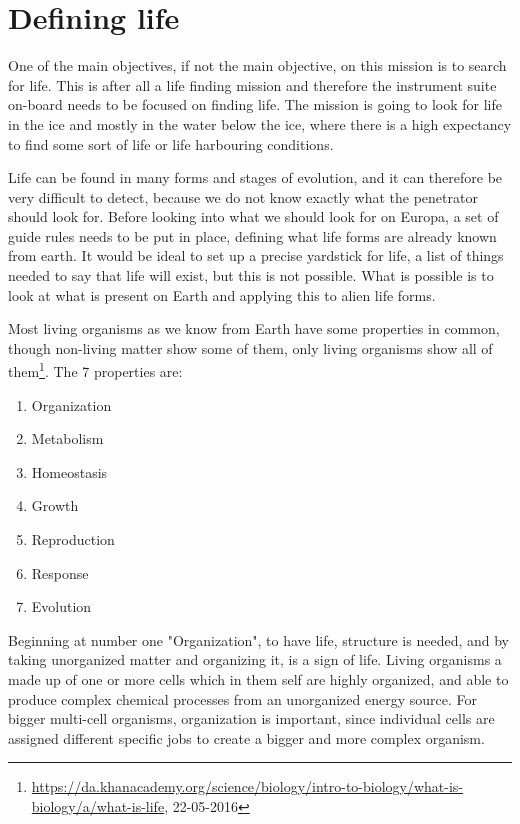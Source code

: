 \section{Defining life}

One of the main objectives, if not the main objective, on this mission is to search for life. This is after all a life finding mission and therefore the instrument suite on-board needs to be focused on finding life. The mission is going to look for life in the ice and mostly in the water below the ice, where there is a high expectancy to find some sort of life or life harbouring conditions.

Life can be found in many forms and stages of evolution, and it can therefore be very difficult to detect, because we do not know exactly what the penetrator should look for. Before looking into what we should look for on Europa, a set of guide rules needs to be put in place, defining what life forms are already known from earth. It would be ideal to set up a precise yardstick for life, a list of things needed to say that life will exist, but this is not possible. What is possible is to look at what is present on Earth and applying this to alien life forms.

Most living organisms as we know from Earth have some properties in common, though non-living matter show some of them, only living organisms show all of them\footnote{\url{https://da.khanacademy.org/science/biology/intro-to-biology/what-is-biology/a/what-is-life}, 22-05-2016}. The 7 properties are:
\begin{enumerate}
  \item Organization
  \item Metabolism
  \item Homeostasis
  \item Growth
  \item Reproduction
  \item Response
  \item Evolution
\end{enumerate}

\noindent
Beginning at number one "Organization", to have life, structure is needed, and by taking unorganized matter and organizing it, is a sign of life. Living organisms a made up of one or more cells which in them self are highly organized, and able to produce complex chemical processes from an unorganized energy source. For bigger multi-cell organisms, organization is important, since individual cells are assigned different specific jobs to create a bigger and more complex organism.

